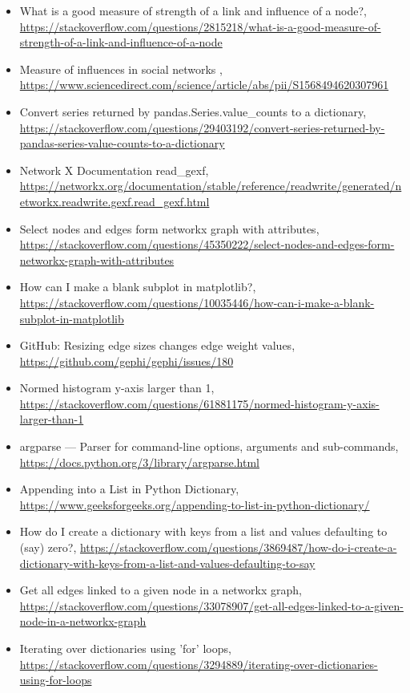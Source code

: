 \documentclass[12pt]{article}
\begin{document}
\begin{itemize}
    \item {What is a good measure of strength of a link and influence of a node?, \url{https://stackoverflow.com/questions/2815218/what-is-a-good-measure-of-strength-of-a-link-and-influence-of-a-node}}
    \item {Measure of influences in social networks
    , \url{https://www.sciencedirect.com/science/article/abs/pii/S1568494620307961}}
    \item {Convert series returned by pandas.Series.value\_counts to a dictionary, \url{https://stackoverflow.com/questions/29403192/convert-series-returned-by-pandas-series-value-counts-to-a-dictionary}}
    \item {Network X Documentation read\_gexf, \url{https://networkx.org/documentation/stable/reference/readwrite/generated/networkx.readwrite.gexf.read_gexf.html}}
    \item {Select nodes and edges form networkx graph with attributes, \url{https://stackoverflow.com/questions/45350222/select-nodes-and-edges-form-networkx-graph-with-attributes}}
    \item {How can I make a blank subplot in matplotlib?, \url{https://stackoverflow.com/questions/10035446/how-can-i-make-a-blank-subplot-in-matplotlib}}
    \item {GitHub: Resizing edge sizes changes edge weight values, \url{https://github.com/gephi/gephi/issues/180}}
    \item {Normed histogram y-axis larger than 1, \url{https://stackoverflow.com/questions/61881175/normed-histogram-y-axis-larger-than-1}}
    \item {argparse — Parser for command-line options, arguments and sub-commands, \url{https://docs.python.org/3/library/argparse.html}}
    \item {Appending into a List in Python Dictionary, \url{https://www.geeksforgeeks.org/appending-to-list-in-python-dictionary/}}
    \item {How do I create a dictionary with keys from a list and values defaulting to (say) zero?, \url{https://stackoverflow.com/questions/3869487/how-do-i-create-a-dictionary-with-keys-from-a-list-and-values-defaulting-to-say}}
    \item {Get all edges linked to a given node in a networkx graph, \url{https://stackoverflow.com/questions/33078907/get-all-edges-linked-to-a-given-node-in-a-networkx-graph}}
    \item {Iterating over dictionaries using 'for' loops, \url{https://stackoverflow.com/questions/3294889/iterating-over-dictionaries-using-for-loops}}

\end{itemize}
\end{document}
